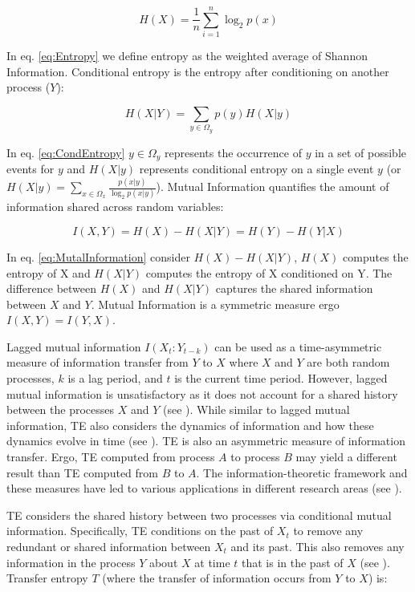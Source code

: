 \begin{equation}
\label{eq:Entropy}
H(X) =  \frac{1}{n} \sum_{i=1}^n  \log_2 p(x)
\end{equation}


\noindent In eq. \ref{eq:Entropy} we define entropy as the weighted average of Shannon Information.  Conditional entropy is the entropy after conditioning on another process (\(Y\)):

\begin{equation}
\label{eq:CondEntropy}
H(X|Y) = \sum_{y \in \Omega_y} p(y) H(X|y)
\end{equation}

\noindent In eq. \ref{eq:CondEntropy} \(y \in \Omega_y\) represents the occurrence of \(y\) in a set of possible events for \(y\) and \(H(X|y)\) represents conditional entropy on a single event \(y\) (or \(H(X|y) = \sum_{x \in \Omega_x}  \frac{p(x|y)}{\log_2p(x|y)} \)). Mutual Information quantifies the amount of information shared across random variables:

\begin{equation}
\label{eq:MutalInformation}
I(X,Y) = H(X) - H(X|Y) = H(Y) - H(Y|X)
\end{equation}

\noindent In eq. \ref{eq:MutalInformation} consider \(H(X) - H(X|Y)\),  \(H(X)\) computes the entropy of X and \(H(X|Y)\) computes the entropy of X conditioned on Y. The difference between \(H(X)\) and \(H(X|Y)\) captures the shared information between \(X\) and \(Y\). Mutual Information is a symmetric measure ergo \(I(X,Y) = I(Y,X)\).

Lagged mutual information \(I(X_t : Y_{t-k})\) can be used as a time-asymmetric measure of information transfer from \(Y\) to \(X\) where \(X\) and \(Y\) are both random processes, \(k\) is a lag period, and \(t\) is the current time period. However, lagged mutual information is unsatisfactory as it does not account for a shared history between the processes \(X\) and \(Y\) (see \cite{MIdiffTE}). While similar to lagged mutual information,  TE also considers the dynamics of information and how these dynamics evolve in time (see \cite{IntroToTransferEntropy}).  TE is also an asymmetric measure of information transfer. Ergo, TE computed from process \(A\) to process \(B\) may yield a different result than TE computed from \(B\) to \(A\). The information-theoretic framework and these measures have led to various applications in different research areas (see \cite{TEBook}).

TE considers the shared history between two processes via conditional mutual information. Specifically, TE conditions on the past of \(X_t\) to remove any redundant or shared information between \(X_t\) and its past. This also removes any information in the process \(Y\) about \(X\) at time \(t\) that is in the past of \(X\) (see \cite{b359}).  Transfer entropy \(T\) (where the transfer of information occurs from \(Y\) to \(X\)) is:

